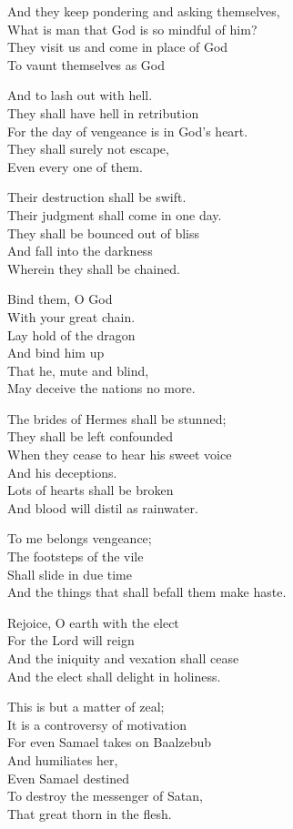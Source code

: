 \documentclass[
]{book}
\begin{document}
And they keep pondering and asking themselves,\\
What is man that God is so mindful of him?\\
They visit us and come in place of God\\
To vaunt themselves as God

And to lash out with hell.\\
They shall have hell in retribution\\
For the day of vengeance is in God's heart.\\
They shall surely not escape,\\
Even every one of them.

Their destruction shall be swift.\\
Their judgment shall come in one day.\\
They shall be bounced out of bliss\\
And fall into the darkness\\
Wherein they shall be chained.

Bind them, O God\\
With your great chain.\\
Lay hold of the dragon\\
And bind him up\\
That he, mute and blind,\\
May deceive the nations no more.

The brides of Hermes shall be stunned;\\
They shall be left confounded\\
When they cease to hear his sweet voice\\
And his deceptions.\\
Lots of hearts shall be broken\\
And blood will distil as rainwater.

To me belongs vengeance;\\
The footsteps of the vile\\
Shall slide in due time\\
And the things that shall befall them make haste.

Rejoice, O earth with the elect\\
For the Lord will reign\\
And the iniquity and vexation shall cease\\
And the elect shall delight in holiness.

This is but a matter of zeal;\\
It is a controversy of motivation\\
For even Samael takes on Baalzebub\\
And humiliates her,\\
Even Samael destined\\
To destroy the messenger of Satan,\\
That great thorn in the flesh.
\end{document}
